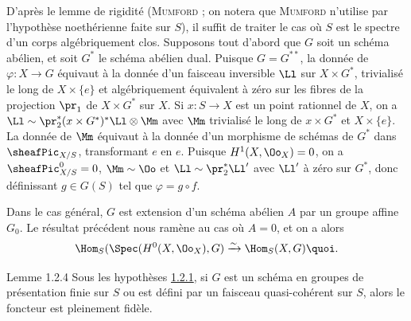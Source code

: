 D'après le lemme de rigidité (\textsc{Mumford} \cite[6.1. p.~115]{4} ;
on notera que
\textsc{Mumford} n'utilise par l'hypothèse noethérienne faite sur $S$), il
suffit de traiter le cas où $S$ est le spectre d'un corps
algébriquement clos. Supposons tout d'abord que $G$ soit un schéma
abélien, et soit $G^{\ast}$ le schéma abélien dual. Puisque
$G=G^{{\ast}{\ast}}$, la donnée de $\varphi:X\rightarrow G$ équivaut à
la donnée d'un faisceau inversible $\Ll$ sur $X\times
G^{\ast}$, trivialisé le long de $X\times \{e\}$ et algébriquement
équivalent à zéro sur les fibres de la projection
$\pr_{1}$ de $X\times G^{\ast}$ sur $X$. Si $x:S\to X$ est un point
rationnel de $X$, on a
$\Ll\sim  \pr^{\ast}_{2}(x\times G^\ast)^{\ast}\Ll\otimes \Mm$ avec
$\Mm$ trivialisé le long de $x\times G^{\ast}$ et $X\times
\{e\}$. La donnée de $\Mm$ équivaut à la donnée d'un morphisme
de schémas de $G^{\ast}$ dans $\sheafPic_{X/S}$, transformant $e$ en
$e$. Puisque $H^{1}(X,\Oo_{X})=0$, on a $\sheafPic^0_{X/S}=0$,
$\Mm\sim\Oo$ et $\Ll\sim
\pr^{\ast}_{2}\Ll'$ avec $\Ll'$ 
à zéro sur
$G^{\ast}$, donc définissant $g\in G(S)$ tel que $\varphi=g\circ f$.

Dans le cas général, $G$ est extension d'un schéma abélien $A$ par un
groupe affine $G_0$. Le résultat précédent nous ramène au cas où
$A=0$, et on a alors
$$
\Hom_{S}(\Spec (H^0(X,\Oo_{X}),G)\xrightarrow{\sim}
\Hom_{S}(X,G){\quoi}.
$$

\begin{enonce*}{Lemme 1.2.4}
Sous les hypothèses \hyperref[XVIII.subsubsec1.2.1]{1.2.1}, si $G$ est un schéma
en groupes de présentation finie sur $S$ ou est défini par un faisceau
quasi-cohérent sur $S$, alors le foncteur  est
pleinement fidèle. 
\end{enonce*}

